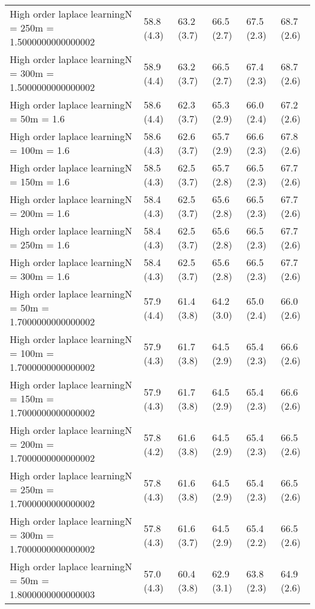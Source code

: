 \documentclass{article}
\begin{document}
\begin{table*}[t!]
\begin{center}
\begin{small}
\begin{sc}
\begin{tabular}{llllll}
High order laplace learningN = 250m = 1.5000000000000002&58.8 (4.3)      &63.2 (3.7)      &66.5 (2.7)      &67.5 (2.3)      &68.7 (2.6)      \\
High order laplace learningN = 300m = 1.5000000000000002&58.9 (4.4)      &63.2 (3.7)      &66.5 (2.7)      &67.4 (2.3)      &68.7 (2.6)      \\
High order laplace learningN = 50m = 1.6&58.6 (4.4)      &62.3 (3.7)      &65.3 (2.9)      &66.0 (2.4)      &67.2 (2.6)      \\
High order laplace learningN = 100m = 1.6&58.6 (4.3)      &62.6 (3.7)      &65.7 (2.9)      &66.6 (2.3)      &67.8 (2.6)      \\
High order laplace learningN = 150m = 1.6&58.5 (4.3)      &62.5 (3.7)      &65.7 (2.8)      &66.5 (2.3)      &67.7 (2.6)      \\
High order laplace learningN = 200m = 1.6&58.4 (4.3)      &62.5 (3.7)      &65.6 (2.8)      &66.5 (2.3)      &67.7 (2.6)      \\
High order laplace learningN = 250m = 1.6&58.4 (4.3)      &62.5 (3.7)      &65.6 (2.8)      &66.5 (2.3)      &67.7 (2.6)      \\
High order laplace learningN = 300m = 1.6&58.4 (4.3)      &62.5 (3.7)      &65.6 (2.8)      &66.5 (2.3)      &67.7 (2.6)      \\
High order laplace learningN = 50m = 1.7000000000000002&57.9 (4.4)      &61.4 (3.8)      &64.2 (3.0)      &65.0 (2.4)      &66.0 (2.6)      \\
High order laplace learningN = 100m = 1.7000000000000002&57.9 (4.3)      &61.7 (3.8)      &64.5 (2.9)      &65.4 (2.3)      &66.6 (2.6)      \\
High order laplace learningN = 150m = 1.7000000000000002&57.9 (4.3)      &61.7 (3.8)      &64.5 (2.9)      &65.4 (2.3)      &66.6 (2.6)      \\
High order laplace learningN = 200m = 1.7000000000000002&57.8 (4.2)      &61.6 (3.8)      &64.5 (2.9)      &65.4 (2.3)      &66.5 (2.6)      \\
High order laplace learningN = 250m = 1.7000000000000002&57.8 (4.3)      &61.6 (3.8)      &64.5 (2.9)      &65.4 (2.3)      &66.5 (2.6)      \\
High order laplace learningN = 300m = 1.7000000000000002&57.8 (4.3)      &61.6 (3.7)      &64.5 (2.9)      &65.4 (2.2)      &66.5 (2.6)      \\
High order laplace learningN = 50m = 1.8000000000000003&57.0 (4.3)      &60.4 (3.8)      &62.9 (3.1)      &63.8 (2.3)      &64.9 (2.6)      \\

\end{tabular}
\end{sc}
\end{small}
\end{center}
\end{table*}
\end{document}

